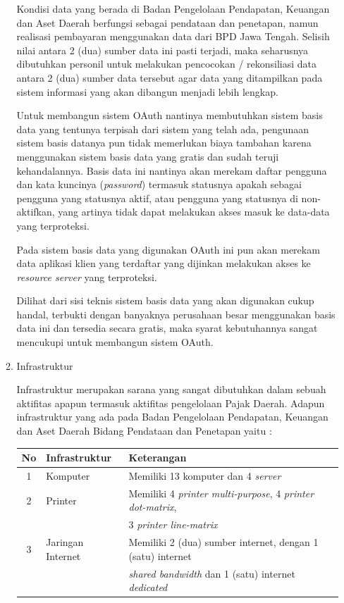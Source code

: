 \documentclass[pdftex,12pt, oneside]{article}
\begin{document}
\begin{enumerate}
\begin{enumerate}
Kondisi data yang berada di Badan Pengelolaan Pendapatan, Keuangan dan Aset Daerah berfungsi sebagai pendataan dan penetapan, namun realisasi pembayaran menggunakan data dari BPD Jawa Tengah. Selisih nilai antara 2 (dua) sumber data ini pasti terjadi, maka seharusnya dibutuhkan personil untuk melakukan pencocokan / rekonsiliasi data antara 2 (dua) sumber data tersebut agar data yang ditampilkan pada sistem informasi yang akan dibangun menjadi lebih lengkap.

Untuk membangun sistem OAuth nantinya membutuhkan sistem basis data yang tentunya terpisah dari sistem yang telah ada, pengunaan sistem basis datanya pun tidak memerlukan biaya tambahan karena menggunakan sistem basis data yang gratis dan sudah teruji kehandalannya. Basis data ini nantinya akan merekam daftar pengguna dan kata kuncinya (\textit{password}) termasuk statusnya apakah sebagai pengguna yang statusnya aktif, atau pengguna yang statusnya di non-aktifkan, yang artinya tidak dapat melakukan akses masuk ke data-data yang terproteksi.

Pada sistem basis data yang digunakan OAuth ini pun akan merekam data aplikasi klien yang terdaftar yang dijinkan melakukan akses ke \textit{resource server} yang terproteksi.

Dilihat dari sisi teknis sistem basis data yang akan digunakan cukup handal, terbukti dengan banyaknya perusahaan besar menggunakan basis data ini dan tersedia secara gratis, maka syarat kebutuhannya sangat mencukupi untuk membangun sistem OAuth.
	
	\item Infrastruktur
	
Infrastruktur merupakan sarana yang sangat dibutuhkan dalam sebuah aktifitas apapun termasuk aktifitas pengelolaan Pajak Daerah. Adapun infrastruktur yang ada pada Badan Pengelolaan Pendapatan, Keuangan dan Aset Daerah Bidang Pendataan dan Penetapan yaitu :

\begin{table}[H]
	\centering
	\begin{tabular}{| c | l | l |}
		\hline 
		No & Infrastruktur & Keterangan \\
		\hline
		1 & Komputer & Memiliki 13 komputer dan 4 \textit{server} \\
		\hline
		2 & Printer & Memiliki 4 \textit{printer multi-purpose}, 4 \textit{printer dot-matrix}, \\
		& & 3 \textit{printer line-matrix} \\
		\hline
		3 & Jaringan Internet & Memiliki 2 (dua) sumber internet, dengan 1 (satu) internet \\
		& & \textit{shared bandwidth} dan 1 (satu) internet \textit{dedicated} \\
		\hline
	\end{tabular}
\end{table}


\end{enumerate}
\end{enumerate}
\end{document}
